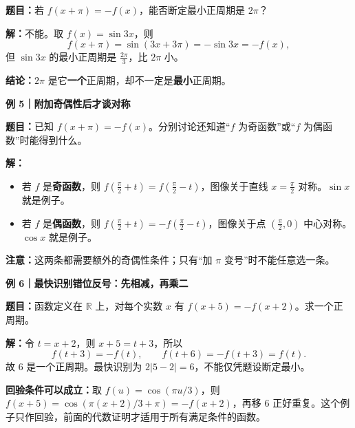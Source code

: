 \begin{examplebox}
\textbf{题目：}若 $f(x+\pi)=-f(x)$，能否断定最小正周期是 $2\pi$？

\textbf{解：}不能。取 $f(x)=\sin3x$，则
\[
f(x+\pi)=\sin(3x+3\pi)=-\sin3x=-f(x),
\]
但 $\sin3x$ 的最小正周期是 $\frac{2\pi}{3}$，比 $2\pi$ 小。

\textbf{结论：}$2\pi$ 是它\textbf{一个}正周期，却不一定是\textbf{最小}正周期。

\medskip
\end{examplebox}\clearpage\begin{examplebox}\textbf{例 5｜附加奇偶性后才谈对称}



\textbf{题目：}已知 $f(x+\pi)=-f(x)$。分别讨论还知道“$f$ 为奇函数”或“$f$ 为偶函数”时能得到什么。

\textbf{解：}
\begin{itemize}[leftmargin=*,itemsep=0.35em]
\item 若 $f$ 是\textbf{奇函数}，则 $f(\frac\pi2+t)=f(\frac\pi2-t)$，图像关于直线 $x=\frac\pi2$ 对称。$\sin x$ 就是例子。
\item 若 $f$ 是\textbf{偶函数}，则 $f(\frac\pi2+t)=-f(\frac\pi2-t)$，图像关于点 $(\frac\pi2,0)$ 中心对称。$\cos x$ 就是例子。
\end{itemize}
\textbf{注意：}这两条都需要额外的奇偶性条件；只有“加 $\pi$ 变号”时不能任意选一条。
\end{examplebox}
\clearpage
\begin{examplebox}
\textbf{例 6｜最快识别错位反号：先相减，再乘二}


\textbf{题目：}函数定义在 $\mathbb R$ 上，对每个实数 $x$ 有 $f(x+5)=-f(x+2)$。求一个正周期。

\textbf{解：}令 $t=x+2$，则 $x+5=t+3$，所以
\[f(t+3)=-f(t),\qquad f(t+6)=-f(t+3)=f(t).\]
故 $\boxed{6\text{ 是一个正周期}}$。最快识别为 $2|5-2|=6$，不能仅凭题设断定最小。

\textbf{回验条件可以成立：}取 $f(u)=\cos(\pi u/3)$，则 $f(x+5)=\cos(\pi(x+2)/3+\pi)=-f(x+2)$，再移 $6$ 正好重复。这个例子只作回验，前面的代数证明才适用于所有满足条件的函数。

\end{examplebox}
